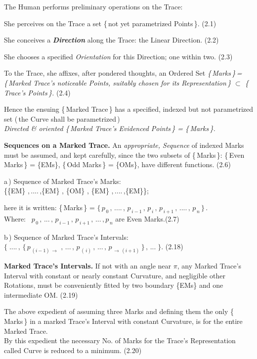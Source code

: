 \documentclass[12pt]{article} %
\begin{document}
\noindent The Human performs preliminary operations on the Trace:

\noindent She perceives on the Trace a set \{\,not yet parametrized Points\,\}. (2.1)

\noindent She conceives a \textbf{\textsl{Direction}} along the Trace: the Linear Direction. (2.2)
 
\noindent She chooses a specified \textsl{\textsl{Orientation}} for this Direction; one within two. (2.3)

\noindent To the Trace, she affixes, after pondered thoughts, an Ordered Set \; \textsl{\{\,Marks\,\}\,=\\ \{\,Marked Trace's noticeable Points, suitably chosen for its Representation\,\} $\subset$ \{\,Trace's Points\,\}.} \qquad (2.4)  

\noindent Hence the ensuing \{\,Marked Trace\,\} has a specified, indexed but not parametrized set (\,the Curve shall be parametrized\,)\\ 
\textsl{Directed \& oriented \{\,Marked Trace's Evidenced Points\,\} = \{\,Marks\,\}.}

\noindent \textbf{Sequences on a Marked Trace.} An \textsl{appropriate, Sequence} of indexed Marks must be assumed, and kept carefully, since the two subsets of \{\,Marks\,\}: \{\,Even Marks\,\} = \{EMs\}, \{\,Odd Marks\,\} = \{OMs\}, have different functions. \quad  (2.6)

\noindent a\,) Sequence of Marked Trace's Marks:\\\big\{\;\{EM\} ,\,....\,,\{EM\} , \{OM\} , \{EM\} ,\,....\,,\{EM\}\;\big\};

\noindent here it is written: \quad \{\,Marks\,\} = $\{\,p_{\,0}\,,\,....\,,\,p_{\,i-1}\,,\,p_{\,i}\,,\,p_{\,i+1}\,,\,....\,,\,p_{\,n}\,\}$\,.\\ Where: \, $p_{\,0}\,,\,...\,,\,p_{\,i-1}\,,\,p_{\,i+1}\,,\,...\,,p_{\,n}$ \; are Even Marks.\qquad (2.7)

\noindent b\,) Sequence of Marked Trace's Intervals:\\ $\big\{\;....\,,\,\{\,p_{\,(i-1)\,\to}\,\,,\,...\,,\,p_{\,(\,i)}\,,\,...\,,\,p_{\,\to\,(i+1)}\,\}\,,\,...\;\big\}$. \qquad (2.18)

\noindent \textbf{Marked Trace's Intervals.} If not with an angle near $\pi$, any Marked Trace's Interval with constant or nearly constant Curvature, and negligible other Rotations, must be conveniently fitted by two boundary \{EMs\} and one intermediate OM. \qquad (2.19) 

\noindent The above expedient of assuming three Marks and defining them the only \{\,Marks\,\} in a marked Trace's Interval with constant Curvature, is for the entire Marked Trace.\\ By this expedient the necessary No. of Marks for the Trace's Representation called Curve is reduced to a minimum. \qquad (2.20)
\end{document}
